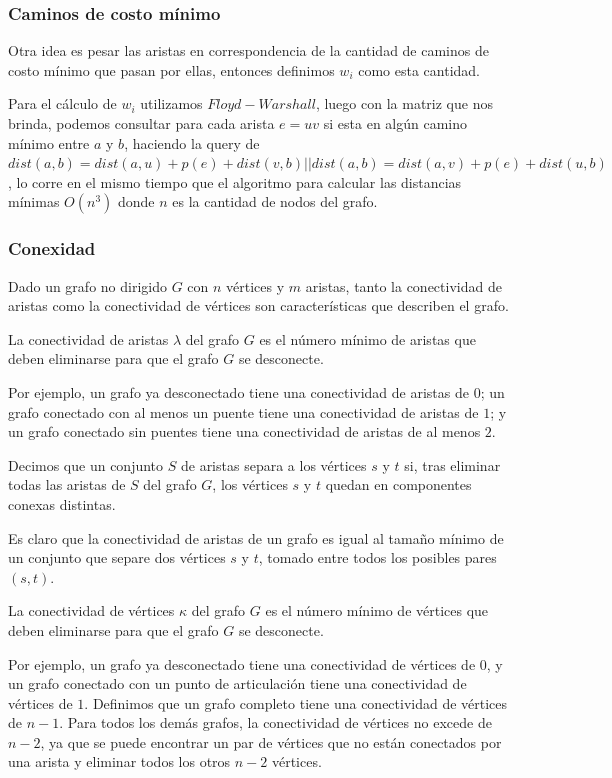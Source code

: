 \documentclass[a4paper]{article}
\begin{document}
\subsubsection{Caminos de costo m\'inimo}

Otra idea es pesar las aristas en correspondencia de la cantidad de caminos de costo m\'inimo que pasan por ellas, entonces definimos $w_i$ como esta cantidad.

Para el c\'alculo de $w_i$ utilizamos $Floyd-Warshall$, luego con la matriz que nos brinda, podemos consultar para cada arista $e=uv$ si esta en alg\'un camino m\'inimo entre $a$ y $b$, haciendo la query de $dist(a,b) = dist(a,u) + p(e) + dist(v,b) || dist(a,b) = dist(a,v) + p(e) + dist(u, b)$, lo corre en el mismo tiempo que el algoritmo para calcular las distancias m\'inimas $O(n^3)$ donde $n$ es la cantidad de nodos del grafo.

\subsubsection{Conexidad}


Dado un grafo no dirigido \(G\) con \(n\) vértices y \(m\) aristas, tanto la conectividad de aristas como la conectividad de vértices son características que describen el grafo.


La conectividad de aristas \(\lambda\) del grafo \(G\) es el número mínimo de aristas que deben eliminarse para que el grafo \(G\) se desconecte.

Por ejemplo, un grafo ya desconectado tiene una conectividad de aristas de \(0\); un grafo conectado con al menos un puente tiene una conectividad de aristas de \(1\); y un grafo conectado sin puentes tiene una conectividad de aristas de al menos \(2\).

Decimos que un conjunto \(S\) de aristas separa a los vértices \(s\) y \(t\) si, tras eliminar todas las aristas de \(S\) del grafo \(G\), los vértices \(s\) y \(t\) quedan en componentes conexas distintas.

Es claro que la conectividad de aristas de un grafo es igual al tamaño mínimo de un conjunto que separe dos vértices \(s\) y \(t\), tomado entre todos los posibles pares \((s, t)\).


La conectividad de vértices \(\kappa\) del grafo \(G\) es el número mínimo de vértices que deben eliminarse para que el grafo \(G\) se desconecte.

Por ejemplo, un grafo ya desconectado tiene una conectividad de vértices de \(0\), y un grafo conectado con un punto de articulación tiene una conectividad de vértices de \(1\). Definimos que un grafo completo tiene una conectividad de vértices de \(n-1\). Para todos los demás grafos, la conectividad de vértices no excede de \(n-2\), ya que se puede encontrar un par de vértices que no están conectados por una arista y eliminar todos los otros \(n-2\) vértices.
\end{document}
